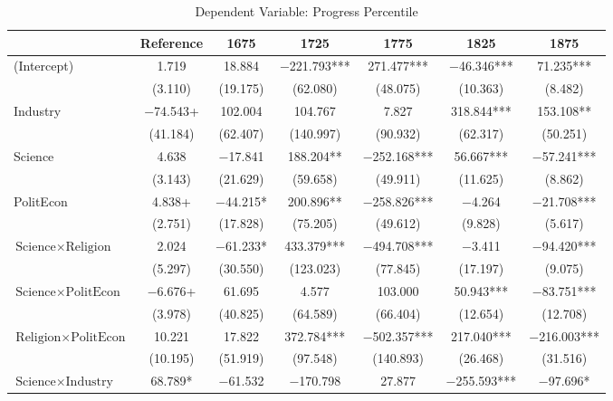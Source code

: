 \begin{table}

\caption{Dependent Variable: Progress Percentile}
\centering
\begin{threeparttable}
\begin{tabular}[t]{lcccccc}
\toprule
  & Reference & 1675 & 1725 & 1775 & 1825 & 1875\\
\midrule
(Intercept) & \num{1.719} & \num{18.884} & \num{-221.793}*** & \num{271.477}*** & \num{-46.346}*** & \num{71.235}***\\
 & (\num{3.110}) & (\num{19.175}) & (\num{62.080}) & (\num{48.075}) & (\num{10.363}) & (\num{8.482})\\
Industry & \num{-74.543}+ & \num{102.004} & \num{104.767} & \num{7.827} & \num{318.844}*** & \num{153.108}**\\
 & (\num{41.184}) & (\num{62.407}) & (\num{140.997}) & (\num{90.932}) & (\num{62.317}) & (\num{50.251})\\
Science & \num{4.638} & \num{-17.841} & \num{188.204}** & \num{-252.168}*** & \num{56.667}*** & \num{-57.241}***\\
 & (\num{3.143}) & (\num{21.629}) & (\num{59.658}) & (\num{49.911}) & (\num{11.625}) & (\num{8.862})\\
PolitEcon & \num{4.838}+ & \num{-44.215}* & \num{200.896}** & \num{-258.826}*** & \num{-4.264} & \num{-21.708}***\\
 & (\num{2.751}) & (\num{17.828}) & (\num{75.205}) & (\num{49.612}) & (\num{9.828}) & (\num{5.617})\\
$\text{Science} \times \text{Religion}$ & \num{2.024} & \num{-61.233}* & \num{433.379}*** & \num{-494.708}*** & \num{-3.411} & \num{-94.420}***\\
 & (\num{5.297}) & (\num{30.550}) & (\num{123.023}) & (\num{77.845}) & (\num{17.197}) & (\num{9.075})\\
$\text{Science} \times \text{PolitEcon}$ & \num{-6.676}+ & \num{61.695} & \num{4.577} & \num{103.000} & \num{50.943}*** & \num{-83.751}***\\
 & (\num{3.978}) & (\num{40.825}) & (\num{64.589}) & (\num{66.404}) & (\num{12.654}) & (\num{12.708})\\
$\text{Religion} \times \text{PolitEcon}$ & \num{10.221} & \num{17.822} & \num{372.784}*** & \num{-502.357}*** & \num{217.040}*** & \num{-216.003}***\\
 & (\num{10.195}) & (\num{51.919}) & (\num{97.548}) & (\num{140.893}) & (\num{26.468}) & (\num{31.516})\\
$\text{Science} \times \text{Industry}$ & \num{68.789}* & \num{-61.532} & \num{-170.798} & \num{27.877} & \num{-255.593}*** & \num{-97.696}*\\

\end{tabular}
\end{threeparttable}
\end{table}
